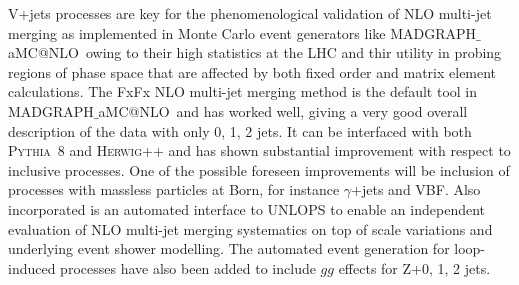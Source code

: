 \documentclass[a4paper,11pt,notoc]{article}
\makeatletter
\newcommand{\PYTHIA}{\textsc{Pythia}}
\newcommand{\HERWIG}{\textsc{Herwig}}
\newcommand{\MGNLO}{MADGRAPH$\_$aMC@NLO}
\makeatother
\begin{document}
V+jets processes are key for the phenomenological validation of NLO multi-jet merging as implemented in Monte Carlo event generators like \MGNLO\, owing to their high statistics at the LHC and thir utility in probing regions of phase space that are affected by both fixed order and matrix element calculations. The FxFx NLO multi-jet merging method is the default tool in \MGNLO\ and has worked well, giving a very good overall description of the data with only 0, 1, 2 jets. It can be interfaced with both \PYTHIA\ 8 and \HERWIG++ and has shown substantial improvement with respect to inclusive processes. One of the possible foreseen improvements will be inclusion of processes with massless particles at Born, for instance $\gamma$+jets and VBF. Also incorporated is an automated interface to UNLOPS to enable an independent evaluation of NLO multi-jet merging systematics on top of scale variations and underlying event shower modelling. The automated event generation for loop-induced processes have also been added to include $gg$ effects for Z+0, 1, 2 jets.
\end{document}
